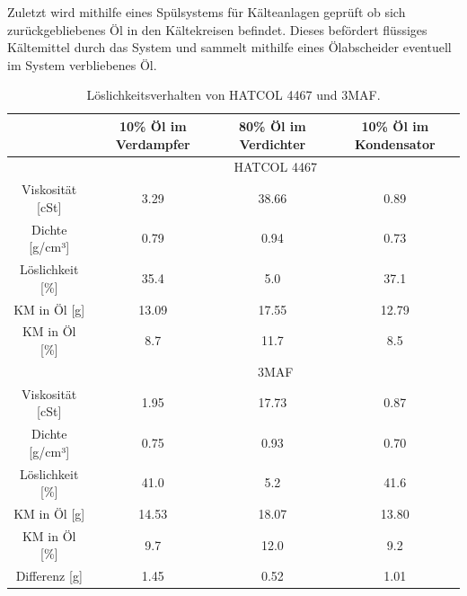Zuletzt wird mithilfe eines Spülsystems für Kälteanlagen geprüft ob sich zurückgebliebenes Öl in den Kältekreisen befindet. Dieses befördert flüssiges Kältemittel durch das System und sammelt mithilfe eines Ölabscheider eventuell im System verbliebenes Öl.

\begin{table}[h!]
\centering
\caption{Löslichkeitsverhalten von HATCOL 4467 und 3MAF.}
\label{tab:LöslichkeitHC3M}
\begin{tabular}{|cccc|}
\hline
                                           & 10\% Öl im Verdampfer      & 80\% Öl im Verdichter     & 10\% Öl im Kondensator \\ \hline
\multicolumn{1}{|l}{}                      & \multicolumn{3}{c|}{HATCOL 4467}                                                  \\ \hline
\multicolumn{1}{|c|}{Viskosität {[}cSt{]}} & \multicolumn{1}{c|}{3.29}  & \multicolumn{1}{c|}{38.66} & 0.89                    \\
\multicolumn{1}{|c|}{Dichte {[}g/cm³{]}}   & \multicolumn{1}{c|}{0.79}  & \multicolumn{1}{c|}{0.94}  & 0.73                    \\
\multicolumn{1}{|c|}{Löslichkeit {[}\%{]}} & \multicolumn{1}{c|}{35.4}  & \multicolumn{1}{c|}{5.0}   & 37.1                    \\
\multicolumn{1}{|c|}{KM in Öl {[}g{]}}     & \multicolumn{1}{c|}{13.09} & \multicolumn{1}{c|}{17.55} & 12.79                   \\
\multicolumn{1}{|c|}{KM in Öl {[}\%{]}}    & \multicolumn{1}{c|}{8.7}     & \multicolumn{1}{c|}{11.7}    & 8.5                       \\ \hline
\multicolumn{1}{|l}{}                      & \multicolumn{3}{c|}{3MAF}                                                         \\ \hline
\multicolumn{1}{|c|}{Viskosität {[}cSt{]}} & \multicolumn{1}{c|}{1.95}  & \multicolumn{1}{c|}{17.73} & 0.87                    \\
\multicolumn{1}{|c|}{Dichte {[}g/cm³{]}}   & \multicolumn{1}{c|}{0.75}  & \multicolumn{1}{c|}{0.93}  & 0.70                    \\
\multicolumn{1}{|c|}{Löslichkeit {[}\%{]}} & \multicolumn{1}{c|}{41.0}  & \multicolumn{1}{c|}{5.2}   & 41.6                    \\
\multicolumn{1}{|c|}{KM in Öl {[}g{]}}     & \multicolumn{1}{c|}{14.53} & \multicolumn{1}{c|}{18.07} & 13.80                   \\
\multicolumn{1}{|c|}{KM in Öl {[}\%{]}}    & \multicolumn{1}{c|}{9.7}    & \multicolumn{1}{c|}{12.0}    & 9.2                       \\ \hline
\multicolumn{1}{|c|}{Differenz {[}g{]}}    & \multicolumn{1}{c|}{1.45}  & \multicolumn{1}{c|}{0.52}  & 1.01                    \\ \hline
\end{tabular}
\end{table}




